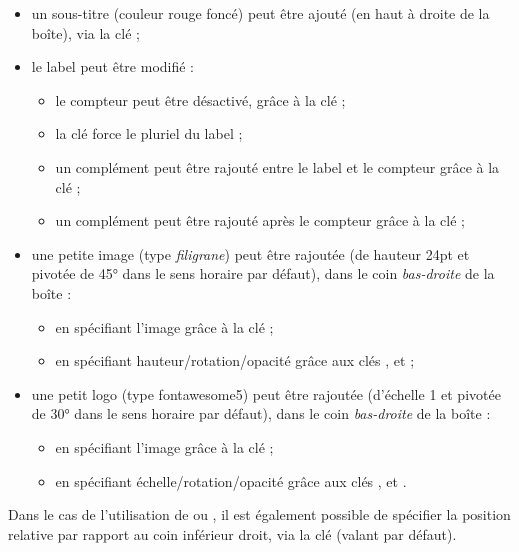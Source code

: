 \documentclass[french,11pt,a4paper]{article}
\begin{document}
\begin{itemize}
	\item un \textsf{sous-titre} (couleur \textsf{rouge foncé}) peut être ajouté (en haut à droite de la boîte), via la clé \MontreCode{[SousTitre=...]} ;
	\item le label peut être modifié :
	\begin{itemize}
		\item le compteur peut être désactivé, grâce à la clé \MontreCode{[Compteur=false]} ;
		\item la clé \MontreCode{[Pluriel]} force le pluriel du label ;
		\item un complément peut être rajouté entre le label et le compteur grâce à la clé \MontreCode{[ModifLabel=...]} ;
		\item un complément peut être rajouté après le compteur grâce à la clé \MontreCode{[ComplementTitre=...]} ;
	\end{itemize}
	\item une petite image (type \textit{filigrane}) peut être rajoutée (de hauteur 24pt et pivotée de 45° dans le sens horaire par défaut), dans le coin \textit{bas-droite} de la boîte :
	\begin{itemize}
		\item en spécifiant l'image grâce à la clé \MontreCode{[Logo=...]} ;
		\item en spécifiant hauteur/rotation/opacité grâce aux clés \MontreCode{[HauteurLogo=...]} , \MontreCode{[RotationLogo=...]} et \MontreCode{[OpaciteLogo=...]} ;
	\end{itemize}
	\item une petit logo (type \textsf{fontawesome5}) peut être rajoutée (d'échelle 1 et pivotée de 30° dans le sens horaire par défaut), dans le coin \textit{bas-droite} de la boîte :
	\begin{itemize}
		\item en spécifiant l'image grâce à la clé \MontreCode{[Icone=...]} ;
		\item en spécifiant échelle/rotation/opacité grâce aux clés \MontreCode{[EchelleIcone=...]} , \MontreCode{[RotationIcone=...]} et \MontreCode{[OpaciteIcone=...]}.
	\end{itemize}
\end{itemize}

Dans le cas de l'utilisation de \MontreCode{[Logo=...]} ou \MontreCode{[Icone=...]}, il est également possible de spécifier la position relative par rapport au coin inférieur droit, via la clé \MontreCode{[OffsetDeco=\{xoffset,yoffset\}]} (valant \MontreCode{\{-10pt,10pt\}} par défaut).
\end{document}
